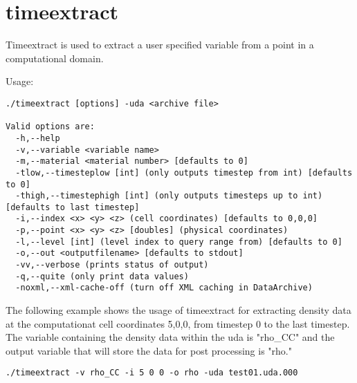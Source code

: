 \section{timeextract} 

Timeextract is used to extract a user specified variable from a point in a computational
domain.  

Usage: \begin{Verbatim}[fontsize=\footnotesize]
./timeextract [options] -uda <archive file>

Valid options are:
  -h,--help
  -v,--variable <variable name>
  -m,--material <material number> [defaults to 0]
  -tlow,--timesteplow [int] (only outputs timestep from int) [defaults to 0]
  -thigh,--timestephigh [int] (only outputs timesteps up to int) [defaults to last timestep]
  -i,--index <x> <y> <z> (cell coordinates) [defaults to 0,0,0]
  -p,--point <x> <y> <z> [doubles] (physical coordinates)
  -l,--level [int] (level index to query range from) [defaults to 0]
  -o,--out <outputfilename> [defaults to stdout]
  -vv,--verbose (prints status of output)
  -q,--quite (only print data values)
  -noxml,--xml-cache-off (turn off XML caching in DataArchive)
 \end{Verbatim} 

The following example shows the usage of timeextract for extracting density data
at the computationat cell coordinates 5,0,0, from timestep 0 to the last
timestep. The variable containing the density data within the uda is "rho\_CC" and the output variable that
will store the data for post processing is "rho." 
\begin{Verbatim}[fontsize=\footnotesize]
./timeextract -v rho_CC -i 5 0 0 -o rho -uda test01.uda.000
\end{Verbatim}


